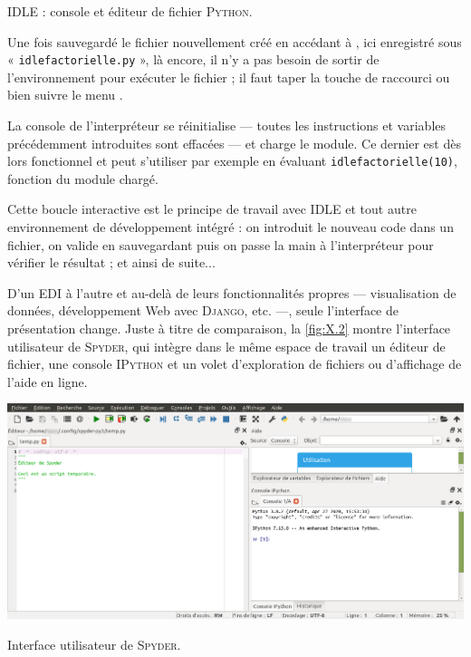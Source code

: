 \begin{jazzfigure*}
\captionsetup{type=figure}%
\caption{\label{fig:X.1}IDLE : console et éditeur de fichier \textsc{Python}.}
\end{jazzfigure*}

Une fois sauvegardé le fichier nouvellement créé en accédant à , ici enregistré sous « \texttt{idlefactorielle.py} », là encore, il n'y a pas besoin de sortir de l'environnement pour exécuter le fichier ; il faut taper la touche de raccourci  ou bien suivre le menu . 

La console de l'interpréteur se réinitialise --- toutes les instructions et variables précédemment introduites sont effacées --- et charge le module. Ce dernier est dès lors fonctionnel et peut s'utiliser par exemple en évaluant \texttt{idlefactorielle(10)}, fonction du module chargé.

Cette boucle interactive est le principe de travail avec IDLE et tout autre environnement de développement intégré : on introduit le nouveau code dans un fichier, on valide en sauvegardant puis on passe la main à l’interpréteur pour vérifier le résultat ; et ainsi de suite...

D'un EDI à l'autre et au-delà de leurs fonctionnalités propres --- visualisation de données, développement Web avec \textsc{Django}, etc. ---, seule l'interface de présentation change. Juste à titre de comparaison, la \cref{fig:X.2} montre l'interface utilisateur de \textsc{Spyder}, qui intègre dans le même espace de travail un éditeur de fichier, une console \textsc{IPython} et un volet d'exploration de fichiers ou d'affichage de l'aide en ligne.

\begin{jazzfigure*}
\centering
\includegraphics[width=\linewidth]{./Images/Chapter10/figX-02-spyder.png}%
\captionsetup{type=figure}%
\caption{\label{fig:X.2}Interface utilisateur de \textsc{Spyder}.}
\end{jazzfigure*}


